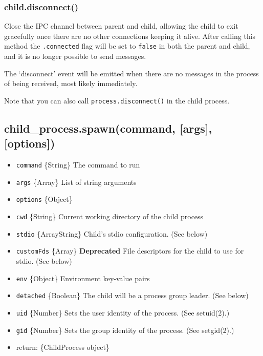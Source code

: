 \subsubsection{child.disconnect()}\label{child.disconnect}

Close the IPC channel between parent and child, allowing the child to
exit gracefully once there are no other connections keeping it alive.
After calling this method the \texttt{.connected} flag will be set to
\texttt{false} in both the parent and child, and it is no longer
possible to send messages.

The `disconnect' event will be emitted when there are no messages in the
process of being received, most likely immediately.

Note that you can also call \texttt{process.disconnect()} in the child
process.

\subsection{child\_process.spawn(command, {[}args{]},
{[}options{]})}\label{childux5fprocess.spawncommand-args-options}

\begin{itemize}
\itemsep1pt\parskip0pt
\item
  \texttt{command} \{String\} The command to run
\item
  \texttt{args} \{Array\} List of string arguments
\item
  \texttt{options} \{Object\}
\item
  \texttt{cwd} \{String\} Current working directory of the child process
\item
  \texttt{stdio} \{Array\textbar{}String\} Child's stdio configuration.
  (See below)
\item
  \texttt{customFds} \{Array\} \textbf{Deprecated} File descriptors for
  the child to use for stdio. (See below)
\item
  \texttt{env} \{Object\} Environment key-value pairs
\item
  \texttt{detached} \{Boolean\} The child will be a process group
  leader. (See below)
\item
  \texttt{uid} \{Number\} Sets the user identity of the process. (See
  setuid(2).)
\item
  \texttt{gid} \{Number\} Sets the group identity of the process. (See
  setgid(2).)
\item
  return: \{ChildProcess object\}
\end{itemize}

